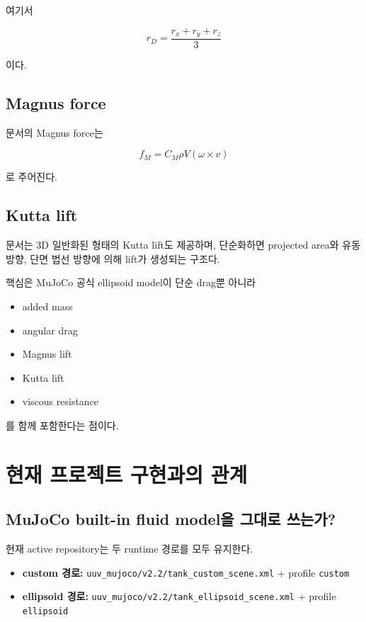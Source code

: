 \documentclass[11pt,a4paper]{article}
\newcommand{\code}[1]{\nolinkurl{#1}}
\begin{document}
여기서

\begin{equation}
r_D = \frac{r_x + r_y + r_z}{3}
\end{equation}

이다.

\subsection{Magnus force}

문서의 Magnus force는

\begin{equation}
f_M = C_M \rho V (\omega \times v)
\end{equation}

로 주어진다.

\subsection{Kutta lift}

문서는 3D 일반화된 형태의 Kutta lift도 제공하며, 단순화하면 projected area와 유동 방향, 단면 법선 방향에 의해 lift가 생성되는 구조다.

핵심은 MuJoCo 공식 ellipsoid model이 단순 drag뿐 아니라

\begin{itemize}[leftmargin=2em]
  \item added mass
  \item angular drag
  \item Magnus lift
  \item Kutta lift
  \item viscous resistance
\end{itemize}

를 함께 포함한다는 점이다.

\section{현재 프로젝트 구현과의 관계}

\subsection{MuJoCo built-in fluid model을 그대로 쓰는가?}

현재 active repository는 두 runtime 경로를 모두 유지한다.

\begin{itemize}[leftmargin=2em]
  \item \textbf{custom 경로:} \code{uuv\_mujoco/v2.2/tank\_custom\_scene.xml} + profile \code{custom}
  \item \textbf{ellipsoid 경로:} \code{uuv\_mujoco/v2.2/tank\_ellipsoid\_scene.xml} + profile \code{ellipsoid}
\end{itemize}
\end{document}
